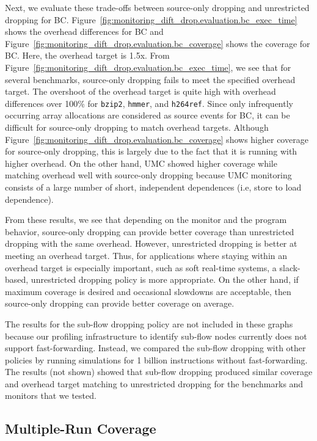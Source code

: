 Next, we evaluate these trade-offs between source-only dropping and
unrestricted dropping for BC.
Figure~\ref{fig:monitoring_dift_drop.evaluation.bc_exec_time} shows the
overhead differences for BC and
Figure~\ref{fig:monitoring_dift_drop.evaluation.bc_coverage} shows the coverage
for BC.  Here, the overhead target is 1.5x.  From
Figure~\ref{fig:monitoring_dift_drop.evaluation.bc_exec_time}, we see that for
several benchmarks, source-only dropping fails to meet the specified overhead
target.  The overshoot of the overhead target is quite high with overhead
differences over 100\% for {\tt bzip2}, {\tt hmmer}, and {\tt h264ref}.  Since
only infrequently occurring array allocations are considered as source events
for BC, it can be difficult for source-only dropping to match overhead targets.
Although Figure~\ref{fig:monitoring_dift_drop.evaluation.bc_coverage} shows
higher coverage for source-only dropping, this is largely due to the fact that
it is running with higher overhead.
On the other hand, UMC showed higher coverage while matching overhead well with
source-only dropping because UMC monitoring consists of a large number of short,
independent dependences (i.e, store to load dependence).

From these results, we see that depending on the monitor and the program
behavior, source-only dropping can provide better coverage than unrestricted
dropping with the same overhead. However, unrestricted dropping is better at
meeting an overhead target.  Thus, for applications where staying within an
overhead target is especially important, such as soft real-time systems, a
slack-based, unrestricted dropping policy is more appropriate. On the other
hand, if maximum coverage is desired and occasional slowdowns are acceptable,
then source-only dropping can provide better coverage on average.

The results for the sub-flow dropping policy are not included in these graphs
because our profiling infrastructure to identify sub-flow nodes currently does
not support fast-forwarding. Instead, we compared the sub-flow dropping with
other policies by running simulations for 1 billion instructions without
fast-forwarding. The results (not shown) showed that sub-flow dropping produced
similar coverage and overhead target matching to unrestricted dropping for the
benchmarks and monitors that we tested.

\subsection{Multiple-Run Coverage}

